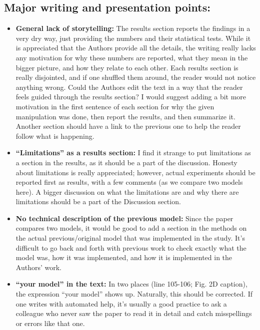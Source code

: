 \documentclass[a4paper, 11pt]{article}
\begin{document}
\subsection*{Major writing and presentation points:}
\begin{itemize}
    \item \textbf{General lack of storytelling:} The results section reports the findings in a very dry way, just providing the numbers and their statistical tests. While it is appreciated that the Authors provide all the details, the writing really lacks any motivation for why these numbers are reported, what they mean in the bigger picture, and how they relate to each other. Each results section is really disjointed, and if one shuffled them around, the reader would not notice anything wrong. Could the Authors edit the text in a way that the reader feels guided through the results section? I would suggest adding a bit more motivation in the first sentence of each section for why the given manipulation was done, then report the results, and then summarize it. Another section should have a link to the previous one to help the reader follow what is happening.
    
    \item \textbf{``Limitations'' as a results section:} I find it strange to put limitations as a section in the results, as it should be a part of the discussion. Honesty about limitations is really appreciated; however, actual experiments should be reported first as results, with a few comments (as we compare two models here). A bigger discussion on what the limitations are and why there are limitations should be a part of the Discussion section.
    
    \item \textbf{No technical description of the previous model:} Since the paper compares two models, it would be good to add a section in the methods on the actual previous/original model that was implemented in the study. It's difficult to go back and forth with previous work to check exactly what the model was, how it was implemented, and how it is implemented in the Authors' work.
    
    \item \textbf{``your model'' in the text:} In two places (line 105-106; Fig. 2D caption), the expression ``your model'' shows up. Naturally, this should be corrected. If one writes with automated help, it's usually a good practice to ask a colleague who never saw the paper to read it in detail and catch misspellings or errors like that one.
\end{itemize}
\end{document}
